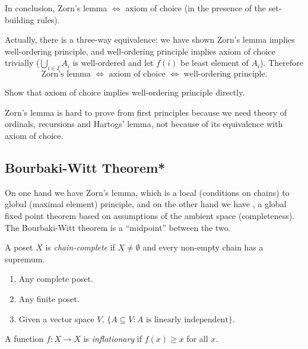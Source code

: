 \documentclass[a4paper]{article}
\begin{document}
In conclusion, Zorn's lemma \(\iff\) axiom of choice (in the presence of the set-building rules).

Actually, there is a three-way equivalence: we have shown Zorn's lemma implies well-ordering principle, and well-ordering principle implies axiom of choice trivially (\(\bigcup_{i \in I} A_i\) is well-ordered and let \(f(i)\) be least element of \(A_i\)). Therefore
\[
  \text{Zorn's lemma } \iff \text{ axiom of choice } \iff \text{ well-ordering principle}.
\]

\begin{ex}
  Show that axiom of choice implies well-ordering principle directly.
\end{ex}

\begin{note}
  Zorn's lemma is hard to prove from first principles because we need theory of ordinals, recursions and Hartogs' lemma, not because of its equivalence with axiom of choice.
\end{note}

\subsection{Bourbaki-Witt Theorem*}

On one hand we have Zorn's lemma, which is a local (conditions on chains) to global (maximal element) principle, and on the other hand we have , a global fixed point theorem based on assumptions of the ambient space (completeness). The Bourbaki-Witt theorem is a ``midpoint'' between the two.

\begin{definition}
  A poset \(X\) is \emph{chain-complete} if \(X \neq \emptyset\) and every non-empty chain has a supremum.
\end{definition}

\begin{eg}\leavevmode
  \begin{enumerate}
  \item Any complete poset.
  \item Any finite poset.
  \item Given a vector space \(V\), \(\{A \subseteq V: A \text{ is linearly independent}\}\).
  \end{enumerate}
\end{eg}

\begin{definition}[Inflationary]
  A function \(f: X \to X\) is \emph{inflationary} if \(f(x) \geq x\) for all \(x\).
\end{definition}
\end{document}
